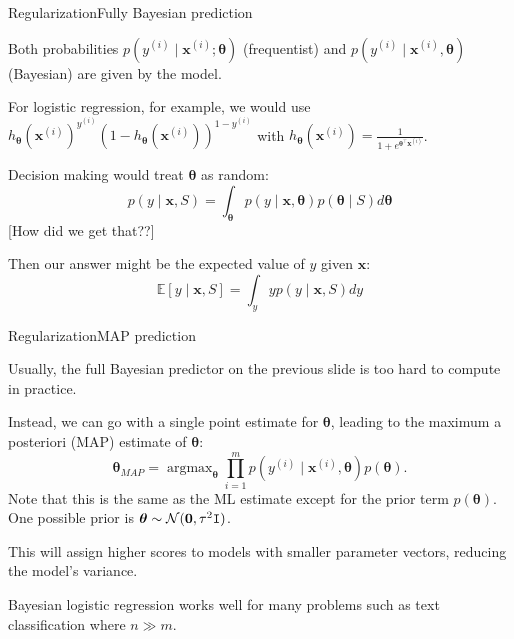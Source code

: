 \documentclass{beamer}
\renewcommand{\vec}[1]{\boldsymbol{#1}}
\newcommand{\mat}[1]{\mathtt{#1}}
\def\Expec{\mathbb{E}}
\DeclareMathOperator*{\argmax}{argmax}
\begin{document}
\begin{frame}{Regularization}{Fully Bayesian prediction}

  Both probabilities $p(y^{(i)}\mid \vec{x}^{(i)}; \vec{\theta})$
  (frequentist) and $p(y^{(i)}\mid \vec{x}^{(i)}, \vec{\theta})$
  (Bayesian) are given by the model.

  \medskip

  For logistic regression, for example, we would use
  $h_{\vec{\theta}}(\vec{x}^{(i)})^{y^{(i)}}(1-h_{\vec{\theta}}(\vec{x}^{(i)}))^{1-y^{(i)}}$ with
  $h_{\vec{\theta}}(\vec{x}^{(i)}) = \frac{1}{1+e^{\vec{\theta}^{\top} \vec{x}^{(i)}}}$.

  \medskip

  Decision making would treat $\vec{\theta}$ as random:
  \[ p(y \mid \vec{x}, S) = \int_{\vec{\theta}} p(y \mid \vec{x},\vec{\theta})
  p(\vec{\theta} \mid S) d\vec{\theta} \]
  [How did we get that??]

  \medskip

  Then our answer might be the expected value of $y$ given $\vec{x}$:
  \[ \Expec[y \mid \vec{x},S] = \int_y y p(y \mid \vec{x},S) dy \]

\end{frame}


\begin{frame}{Regularization}{MAP prediction}

  Usually, the full Bayesian predictor on the previous slide is too
  hard to compute in practice.

  \medskip

  Instead, we can go with a single point estimate for $\vec{\theta}$,
  leading to the \alert{maximum a posteriori} (MAP) estimate of
  $\vec{\theta}$:
  \[ \vec{\theta}_{MAP} = \argmax_{\vec{\theta}} \prod_{i=1}^m p(y^{(i)} \mid \vec{x}^{(i)},\vec{\theta}) p(\vec{\theta}) . \]
  Note that this is the same as the ML estimate except for the
  \alert{prior term} $p(\vec{\theta})$.  One possible prior is
  $\vec{\theta} \sim {\cal N}(\vec{0},\tau^2 \mat{I})$.

  \medskip

  This will assign higher scores to models with smaller parameter
  vectors, reducing the model's variance.

  \medskip

  \alert{Bayesian logistic regression} works well for many problems
  such as text classification where $n \gg m$.
  
\end{frame}
\end{document}
